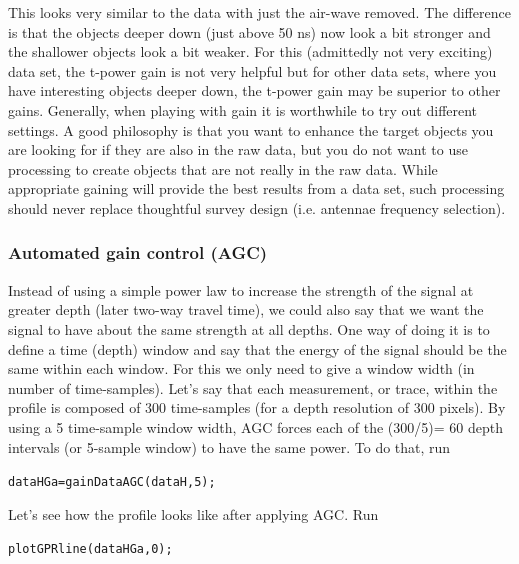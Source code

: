\documentclass[11pt]{article}
\begin{document}
This looks very similar to the data with just the air-wave
removed. The difference is that the objects deeper down (just above 50
ns) now look a bit stronger and the shallower objects look a bit
weaker. For this (admittedly not very exciting) data set, the t-power
gain is not very helpful but for other data sets, where you have
interesting objects deeper down, the t-power gain may be superior to
other gains. Generally, when playing with gain it is worthwhile to try
out different settings. A good philosophy is that you want to enhance
the target objects you are looking for if they are also in the raw
data, but you do not want to use processing to create objects that are
not really in the raw data. While appropriate gaining will provide the
best results from a data set, such processing should never replace
thoughtful survey design (i.e. antennae frequency selection). 

\subsubsection{Automated gain control (AGC)}

Instead of using a simple power law to increase the strength of the
signal at greater depth (later two-way travel time), we could also say
that we want the signal to have about the same strength at all
depths. One way of doing it is to define a time (depth) window and say
that the energy of the signal should be the same within each
window. For this we only need to give a window width (in number of
time-samples). Let's say that each measurement, or trace, within the profile is 
composed of 300 time-samples (for a depth resolution of 300 pixels).
By using a 5 time-sample window width, AGC forces each of the (300/5)= 60
depth intervals (or 5-sample window) to have the same power.
To do that, run
 
\qquad \verb#dataHGa=gainDataAGC(dataH,5);#

Let's see how the profile looks like after applying
AGC. Run

\qquad \verb#plotGPRline(dataHGa,0);#
\end{document}
